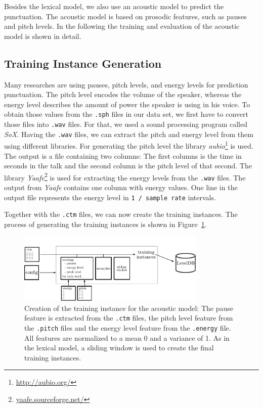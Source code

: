 Besides the lexical model, we also use an acoustic model to predict the punctuation.
The acoustic model is based on prosodic features, such as pauses and pitch levels.
In the following the training and evaluation of the acoustic model is shown in detail.

\subsection{Training Instance Generation}

Many researches are using pauses, pitch levels, and energy levels for prediction punctuation.
The pitch level encodes the volume of the speaker, whereas the energy level describes the amount of power the speaker is using in his voice.
To obtain those values from the \texttt{.sph} files in our data set, we first have to convert those files into \texttt{.wav} files.
For that, we used a sound processing program called \emph{SoX}.
Having the \texttt{.wav} files, we can extract the pitch and energy level from them using different libraries.
For generating the pitch level the library \emph{aubio}\footnote{\url{http://aubio.org/}} is used.
The output is a file containing two columns: The first columns is the time in seconds in the talk and the second column is the pitch level of that second.
The library \emph{Yaafe}\footnote{\url{yaafe.sourceforge.net/}} is used for extracting the energy levels from the \texttt{.wav} files.
The output from \emph{Yaafe} contains one column with energy values.
One line in the output file represents the energy level in \texttt{1 / sample rate} intervals.

Together with the \texttt{.ctm} files, we can now create the training instances.
The process of generating the training instances is shown in Figure~\ref{fig:overview_acoustic}.

\begin{figure}[ht]
    \centering
    \includegraphics[width=0.8\textwidth]{img/overview_accoustic.pdf}
    \caption{Creation of the training instance for the acoustic model: The pause feature is extracted from the \texttt{.ctm} files, the pitch level feature from the \texttt{.pitch} files and the energy level feature from the \texttt{.energy} file. All features are normalized to a mean 0 and a variance of 1. As in the lexical model, a sliding window is used to create the final training instances.}
    \label{fig:overview_acoustic}
\end{figure}

